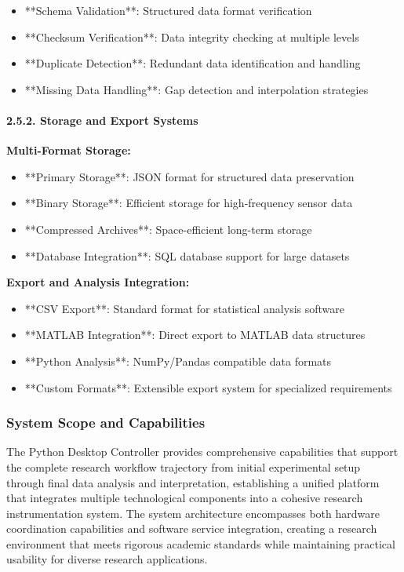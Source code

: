 \documentclass[12pt,a4paper]{article}
\begin{document}
\begin{itemize}
\item **Schema Validation**: Structured data format verification
\item **Checksum Verification**: Data integrity checking at multiple levels
\item **Duplicate Detection**: Redundant data identification and handling
\item **Missing Data Handling**: Gap detection and interpolation strategies

\end{itemize}
\paragraph{2.5.2. Storage and Export Systems}

\textbf{Multi-Format Storage:}

\begin{itemize}
\item **Primary Storage**: JSON format for structured data preservation
\item **Binary Storage**: Efficient storage for high-frequency sensor data
\item **Compressed Archives**: Space-efficient long-term storage
\item **Database Integration**: SQL database support for large datasets

\end{itemize}
\textbf{Export and Analysis Integration:}

\begin{itemize}
\item **CSV Export**: Standard format for statistical analysis software
\item **MATLAB Integration**: Direct export to MATLAB data structures
\item **Python Analysis**: NumPy/Pandas compatible data formats
\item **Custom Formats**: Extensible export system for specialized requirements

\end{itemize}
\subsubsection{System Scope and Capabilities}

The Python Desktop Controller provides comprehensive capabilities that support the complete research workflow trajectory
from initial experimental setup through final data analysis and interpretation, establishing a unified platform that
integrates multiple technological components into a cohesive research instrumentation system. The system architecture
encompasses both hardware coordination capabilities and software service integration, creating a research environment
that meets rigorous academic standards while maintaining practical usability for diverse research applications.
\end{document}
